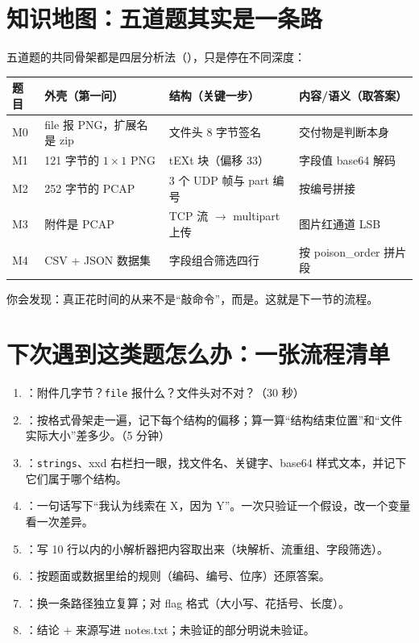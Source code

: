 \documentclass[UTF8,12pt,oneside]{ctexbook}
\begin{document}
\section{知识地图：五道题其实是一条路}
五道题的共同骨架都是四层分析法（），只是停在不同深度：
\begin{center}
\begin{tabular}{p{}p{}p{}p{}}
\toprule
题目 & 外壳（第一问） & 结构（关键一步） & 内容/语义（取答案） \\
\midrule
M0 & file 报 PNG，扩展名是 zip & 文件头 8 字节签名 & 交付物是判断本身 \\
M1 & 121 字节的 $1\times1$ PNG & tEXt 块（偏移 33） & 字段值 base64 解码 \\
M2 & 252 字节的 PCAP & 3 个 UDP 帧与 part 编号 & 按编号拼接 \\
M3 & 附件是 PCAP & TCP 流 $\rightarrow$ multipart 上传 & 图片红通道 LSB \\
M4 & CSV + JSON 数据集 & 字段组合筛选四行 & 按 poison\_order 拼片段 \\
\bottomrule
\end{tabular}
\end{center}
你会发现：真正花时间的从来不是“敲命令”，而是。这就是下一节的流程。

\section{下次遇到这类题怎么办：一张流程清单}
\begin{enumerate}[label=\arabic*.]
\item {}：附件几字节？\verb|file| 报什么？文件头对不对？（30 秒）
\item {}：按格式骨架走一遍，记下每个结构的偏移；算一算“结构结束位置”和“文件实际大小”差多少。（5 分钟）
\item {}：\verb|strings|、xxd 右栏扫一眼，找文件名、关键字、base64 样式文本，并记下它们属于哪个结构。
\item {}：一句话写下“我认为线索在 X，因为 Y”。一次只验证一个假设，改一个变量看一次差异。
\item {}：写 10 行以内的小解析器把内容取出来（块解析、流重组、字段筛选）。
\item {}：按题面或数据里给的规则（编码、编号、位序）还原答案。
\item {}：换一条路径独立复算；对 flag 格式（大小写、花括号、长度）。
\item {}：结论 + 来源写进 notes.txt；未验证的部分明说未验证。
\end{enumerate}
\end{document}
